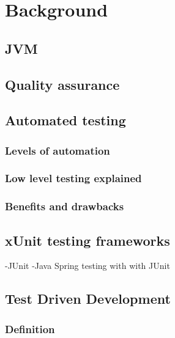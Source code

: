 \chapter{Background}
\label{chapter:background} 

\section{JVM}
\section{Quality assurance}
\section{Automated testing}
    \subsection{Levels of automation}
    \subsection{Low level testing explained}
    \subsection{Benefits and drawbacks}
\section{xUnit testing frameworks}
-JUnit\newline
-Java Spring testing with with JUnit\newline
\section{Test Driven Development}
    \subsection{Definition}
